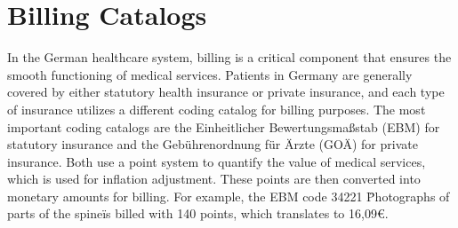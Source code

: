 \section{Billing Catalogs}\label{sec:billing-catalogs}
In the German healthcare system, billing is a critical component that ensures the smooth functioning of medical services.
Patients in Germany are generally covered by either statutory health insurance or private insurance, and each type of insurance
utilizes a different coding catalog for billing purposes.
The most important coding catalogs are the Einheitlicher Bewertungsmaßstab (EBM) for statutory insurance and the Gebührenordnung für Ärzte (GOÄ) for private insurance.
Both use a point system to quantify the value of medical services, which is used for inflation adjustment.
These points are then converted into monetary amounts for billing.
For example, the EBM code 34221 \"Photographs of parts of the spine\" is billed with 140 points, which translates to 16,09€.


